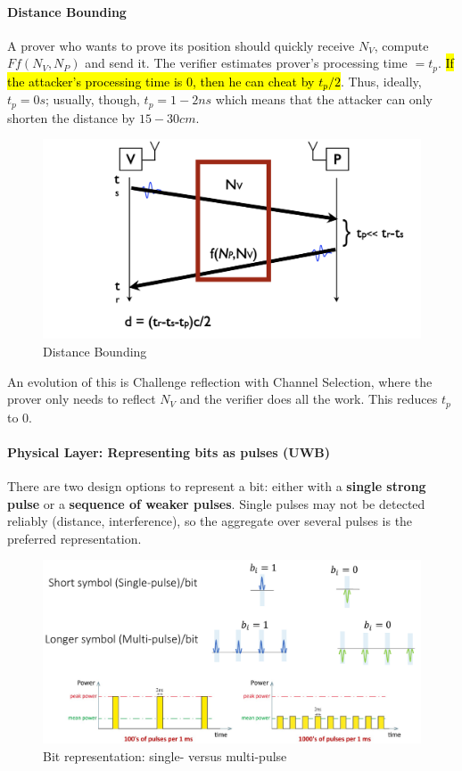 \paragraph{Distance Bounding}
A prover who wants to prove its position should quickly receive $N_V$, compute $Ff(N_V,N_P)$ and send it.
The verifier estimates prover's processing time $=t_p$. \hl{If the attacker's processing time is $0$, then he can cheat by $t_p/2$}. Thus, ideally, $t_p=0s$; usually, though, $t_p=1-2ns$ which means that the attacker can only shorten the distance by $15-30cm$.
\begin{figure}[h]
	\centering
	\includegraphics[scale=0.4]{images/5-dist-bounding.png}
	\caption{Distance Bounding}%
	\label{fig:dist_bounding}
\end{figure}
An evolution of this is Challenge reflection with Channel Selection, where the prover only needs to reflect $N_V$ and the verifier does all the work. This reduces $t_p$ to $0$.

\paragraph{Physical Layer: Representing bits as pulses (UWB)}
There are two design options to represent a bit: either with a \textbf{single strong pulse} or a \textbf{sequence of weaker pulses}.
Single pulses may not be detected reliably (distance, interference), so the aggregate over several pulses is the preferred representation.

\begin{figure}[h]
	\centering
	\includegraphics[scale=0.3]{images/5-single-multi-pulse.png}
	\caption{Bit representation: single- versus multi-pulse}%
	\label{fig:single-multi-pulse}
\end{figure}


